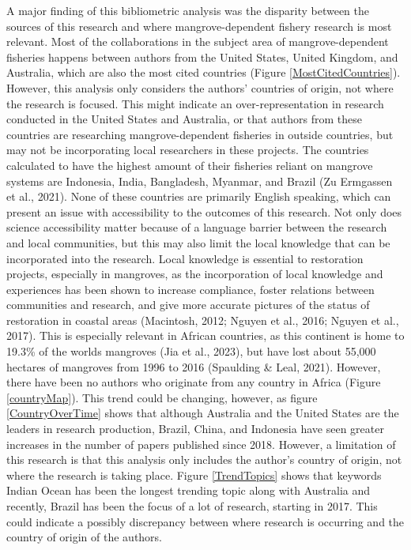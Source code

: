 \documentclass[
  12pt,
]{article}
\begin{document}
A major finding of this bibliometric analysis was the disparity between the sources of this research and where mangrove-dependent fishery research is most relevant. Most of the collaborations in the subject area of mangrove-dependent fisheries happens between authors from the United States, United Kingdom, and Australia, which are also the most cited countries (Figure \ref{MostCitedCountries}). However, this analysis only considers the authors' countries of origin, not where the research is focused. This might indicate an over-representation in research conducted in the United States and Australia, or that authors from these countries are researching mangrove-dependent fisheries in outside countries, but may not be incorporating local researchers in these projects. The countries calculated to have the highest amount of their fisheries reliant on mangrove systems are Indonesia, India, Bangladesh, Myanmar, and Brazil (Zu Ermgassen et al., 2021). None of these countries are primarily English speaking, which can present an issue with accessibility to the outcomes of this research. Not only does science accessibility matter because of a language barrier between the research and local communities, but this may also limit the local knowledge that can be incorporated into the research. Local knowledge is essential to restoration projects, especially in mangroves, as the incorporation of local knowledge and experiences has been shown to increase compliance, foster relations between communities and research, and give more accurate pictures of the status of restoration in coastal areas (Macintosh, 2012; Nguyen et al., 2016; Nguyen et al., 2017). This is especially relevant in African countries, as this continent is home to 19.3\% of the worlds mangroves (Jia et al., 2023), but have lost about 55,000 hectares of mangroves from 1996 to 2016 (Spaulding \& Leal, 2021). However, there have been no authors who originate from any country in Africa (Figure \ref{countryMap}). This trend could be changing, however, as figure \ref{CountryOverTime} shows that although Australia and the United States are the leaders in research production, Brazil, China, and Indonesia have seen greater increases in the number of papers published since 2018. However, a limitation of this research is that this analysis only includes the author's country of origin, not where the research is taking place. Figure \ref{TrendTopics} shows that keywords Indian Ocean has been the longest trending topic along with Australia and recently, Brazil has been the focus of a lot of research, starting in 2017. This could indicate a possibly discrepancy between where research is occurring and the country of origin of the authors.
\end{document}
